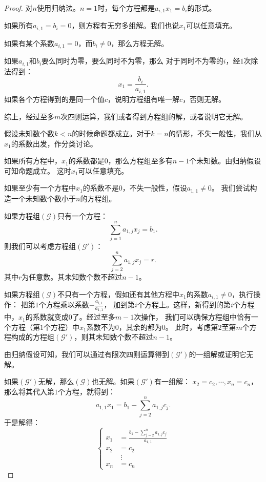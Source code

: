 \documentclass[12pt,UTF8]{ctexbook}
\begin{document}
\begin{proof}
    对$n$使用归纳法。$n=1$时，每个方程都是$a_{i,1} x_1 = b_i$的形式。

    如果所有$a_{i,1} = b_i = 0$，则方程有无穷多组解。我们也说$x_1$可以任意填充。
    
    如果有某个系数$a_{i,1} = 0$，而$b_i\neq 0$，那么方程无解。

    如果$a_{i,1}$和$b_i$要么同时为零，要么同时不为零，那么
    对于同时不为零的$i$，经$1$次除法得到：
    $$ x_1 = \frac{b_i}{a_{i,1}}. $$
    如果各个方程得到的是同一个值$c$，说明方程组有唯一解$c$，否则无解。

    综上，经过至多$m$次四则运算，我们或者得到方程组的解，或者说明它无解。

    假设未知数个数$k<n$的时候命题都成立。对于$k=n$的情形，不失一般性，我们从$x_1$的系数出发，作分类讨论。

    如果所有方程中，$x_1$的系数都是$0$，那么方程组至多有$n-1$个未知数。由归纳假设可知命题成立。
    这时$x_1$可以任意填充。

    如果至少有一个方程中$x_1$的系数不是$0$，不失一般性，假设$a_{1,1} \neq 0$。
    我们尝试构造一个未知数个数小于$n$的方程组。

    如果方程组$(\mathcal{G})$只有一个方程：
    $$ \sum_{j=1}^n a_{1,j} x_j = b_{1}. $$
    则我们可以考虑方程组$(\mathcal{G}')$：
    $$ \sum_{j=2}^n a_{1,j} x_j = r. $$
    其中$r$为任意数。其未知数个数不超过$n-1$。



    如果方程组$(\mathcal{G})$不只有一个方程，假如还有其他方程中$x_1$的系数$a_{i,1} \neq 0$，执行操作：
    把第$1$个方程乘以系数$-\frac{a_{i,1}}{a_{1,1}}$，
    加到第$i$个方程上。这样，新得到的第$i$个方程中，$x_1$的系数就变成$0$了。经过至多$m-1$次操作，
    我们可以确保方程组中恰有一个方程（第$1$个方程）中$x_1$系数不为$0$，其余的都为$0$。
    此时，考虑第$2$至第$m$个方程构成的方程组$(\mathcal{G}')$，则其未知数个数不超过$n-1$。

    由归纳假设可知，我们可以通过有限次四则运算得到$(\mathcal{G}')$的一组解或证明它无解。

    如果$(\mathcal{G}')$无解，那么$(\mathcal{G})$也无解。如果$(\mathcal{G}')$有一组解：
    $x_2 = c_2, \cdots , x_n = c_n$，那么将其代入第$1$个方程，就得到：
    $$ a_{1,1} x_1 = b_{1} - \sum_{j=2}^n a_{1,j} c_j. $$
    于是解得：
    $$ \left\{
        \begin{array}{rl}
        x_1 &= \displaystyle \frac{b_{1} - \sum_{j=2}^n a_{1,j} c_j}{a_{1,1}} \\
        x_2 &= c_2  \\
        \quad & \:\vdots   \\
        x_n &= c_n 
        \end{array}
    \right.$$


\end{proof}
\end{document}
